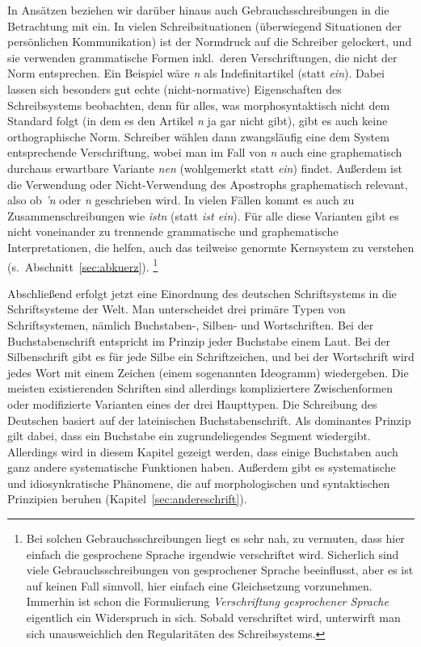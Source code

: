In Ansätzen beziehen wir darüber hinaus auch Gebrauchsschreibungen in die Betrachtung mit ein.
In vielen Schreibsituationen (überwiegend Situationen der persönlichen Kommunikation) ist der Normdruck auf die Schreiber gelockert, und sie verwenden grammatische Formen inkl.\ deren Verschriftungen, die nicht der Norm entsprechen.
Ein Beispiel wäre \textit{n} als Indefinitartikel (statt \textit{ein}).
Dabei lassen sich besonders gut echte (nicht-normative) Eigenschaften des Schreibsystems beobachten, denn für alles, was morphosyntaktisch nicht dem Standard folgt (in dem es den Artikel \textit{n} ja gar nicht gibt), gibt es auch keine orthographische Norm.
Schreiber wählen dann zwangsläufig eine dem System entsprechende Verschriftung, wobei man im Fall von \textit{n} auch eine graphematisch durchaus erwartbare Variante \textit{nen} (wohlgemerkt statt \textit{ein}) findet.
Außerdem ist die Verwendung oder Nicht-Verwendung des Apostrophs graphematisch relevant, also ob \textit{'n} oder \textit{n} geschrieben wird.
In vielen Fällen kommt es auch zu Zusammenschreibungen wie \textit{istn} (statt \textit{ist ein}).
Für alle diese Varianten gibt es nicht voneinander zu trennende grammatische und graphematische Interpretationen, die helfen, auch das teilweise genormte Kernsystem zu verstehen (s.\ Abschnitt~\ref{sec:abkuerz}).%
\footnote{Bei solchen Gebrauchsschreibungen liegt es sehr nah, zu vermuten, dass hier einfach die gesprochene Sprache irgendwie verschriftet wird.
Sicherlich sind viele Gebrauchsschreibungen von gesprochener Sprache beeinflusst, aber es ist auf keinen Fall sinnvoll, hier einfach eine Gleichsetzung vorzunehmen.
Immerhin ist schon die Formulierung \textit{Verschriftung gesprochener Sprache} eigentlich ein Widerspruch in sich.
Sobald verschriftet wird, unterwirft man sich unausweichlich den Regularitäten des Schreibsystems.}

Abschließend erfolgt jetzt eine Einordnung des deutschen Schriftsystems in die Schriftsysteme der Welt.
Man unterscheidet drei primäre Typen von Schriftsystemen, nämlich Buchstaben-, Silben- und Wortschriften.
Bei der Buchstabenschrift entspricht im Prinzip jeder Buchstabe einem Laut.
Bei der Silbenschrift gibt es für jede Silbe ein Schriftzeichen, und bei der Wortschrift wird jedes Wort mit einem Zeichen (einem sogenannten Ideogramm) wiedergeben.
Die meisten existierenden Schriften sind allerdings kompliziertere Zwischenformen oder modifizierte Varianten eines der drei Haupttypen.
Die Schreibung des Deutschen basiert auf der lateinischen Buchstabenschrift.
Als dominantes Prinzip gilt dabei, dass ein Buchstabe ein zugrundeliegendes Segment wiedergibt.
Allerdings wird in diesem Kapitel gezeigt werden, dass einige Buchstaben auch ganz andere systematische Funktionen haben.
Außerdem gibt es systematische und idiosynkratische Phänomene, die auf morphologischen und syntaktischen Prinzipien beruhen (Kapitel~\ref{sec:andereschrift}).

